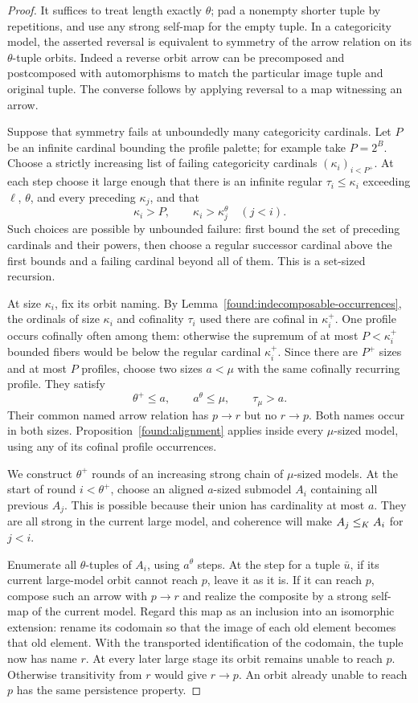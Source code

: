 \begin{proof}
It suffices to treat length exactly $\theta$; pad a
nonempty shorter tuple by repetitions, and use any
strong self-map for the empty tuple. In a categoricity
model, the asserted reversal is equivalent to symmetry
of the arrow relation on its $\theta$-tuple orbits.
Indeed a reverse orbit arrow can be precomposed and
postcomposed with automorphisms to match the particular
image tuple and original tuple. The converse follows
by applying reversal to a map witnessing an arrow.

Suppose that symmetry fails at unboundedly many
categoricity cardinals. Let $P$ be an infinite cardinal
bounding the profile palette; for example take $P=2^B$.
Choose a strictly increasing list of failing
categoricity cardinals $(\kappa_i)_{i<P^+}$. At each
step choose it large enough that there is an infinite
regular $\tau_i\leq\kappa_i$ exceeding $\ell$, $\theta$,
and every preceding $\kappa_j$, and that
\[
\kappa_i>P,\qquad
\kappa_i>\kappa_j^\theta\quad(j<i).
\]
Such choices are possible by unbounded failure: first
bound the set of preceding cardinals and their powers,
then choose a regular successor cardinal above the
first bounds and a failing cardinal beyond all of
them. This is a set-sized recursion.

At size $\kappa_i$, fix its orbit naming. By
Lemma~\ref{found:indecomposable-occurrences}, the
ordinals of size $\kappa_i$ and cofinality $\tau_i$
used there are cofinal in $\kappa_i^+$. One profile
occurs cofinally often among them: otherwise the
supremum of at most $P<\kappa_i^+$ bounded fibers
would be below the regular cardinal $\kappa_i^+$.
Since there are $P^+$ sizes and at most $P$ profiles,
choose two sizes $a<\mu$ with the same cofinally
recurring profile. They satisfy
\[
\theta^+\leq a,\qquad a^\theta\leq\mu,
\qquad \tau_\mu>a.
\]
Their common named arrow relation has $p\longrightarrow r$
but no $r\longrightarrow p$. Both names occur in
both sizes. Proposition~\ref{found:alignment} applies
inside every $\mu$-sized model, using any of its
cofinal profile occurrences.

We construct $\theta^+$ rounds of an increasing strong
chain of $\mu$-sized models. At the start of round
$i<\theta^+$, choose an aligned $a$-sized submodel
$A_i$ containing all previous $A_j$. This is possible
because their union has cardinality at most $a$.
They are all strong in the current large model, and
coherence will make $A_j\leq_K A_i$ for $j<i$.

Enumerate all $\theta$-tuples of $A_i$, using
$a^\theta$ steps. At the step for a tuple $\bar u$,
if its current large-model orbit cannot reach $p$,
leave it as it is. If it can reach $p$, compose such
an arrow with $p\longrightarrow r$ and realize the
composite by a strong self-map of the current model.
Regard this map as an inclusion into an isomorphic
extension: rename its codomain so that the image of
each old element becomes that old element. With the
transported identification of the codomain, the
tuple now has name $r$. At every later large stage
its orbit remains unable to reach $p$. Otherwise
transitivity from $r$ would give $r\longrightarrow p$.
An orbit already unable to reach $p$ has the same
persistence property.


\end{proof}
